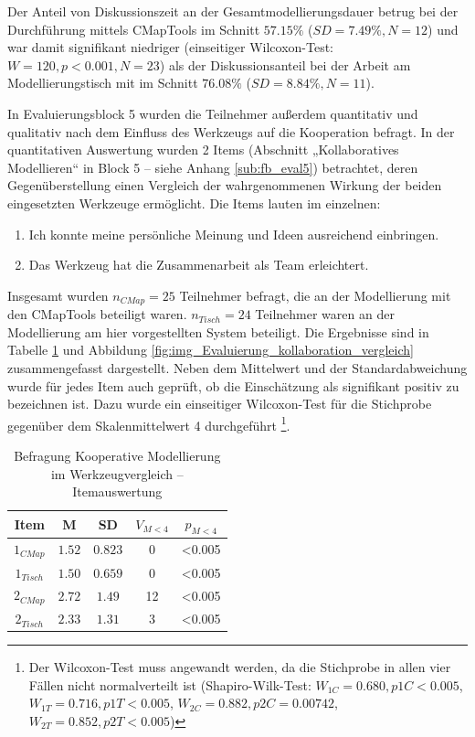 Der Anteil von Diskussionszeit an der Gesamtmodellierungsdauer betrug bei der Durchführung mittels CMapTools im Schnitt $57.15\%$ ($SD=7.49\%, N=12$) und war damit signifikant niedriger (einseitiger Wilcoxon-Test: $W=120, p<0.001, N=23$) als der Diskussionsanteil bei der Arbeit am Modellierungstisch mit im Schnitt $76.08\%$ ($SD=8.84\%, N=11$).

In Evaluierungsblock 5 wurden die Teilnehmer außerdem quantitativ und qualitativ nach dem Einfluss des Werkzeugs auf die Kooperation befragt. In der quantitativen Auswertung wurden 2 Items (Abschnitt „Kollaboratives Modellieren“ in Block 5 -- siehe Anhang \ref{sub:fb_eval5}) betrachtet, deren Gegenüberstellung einen Vergleich der wahrgenommenen Wirkung der beiden eingesetzten Werkzeuge ermöglicht. Die Items lauten im einzelnen:

\begin{enumerate}
	\item Ich konnte meine persönliche Meinung und Ideen ausreichend einbringen.
	\item Das Werkzeug hat die Zusammenarbeit als Team erleichtert.
\end{enumerate}

Insgesamt wurden $n_{CMap}=25$ Teilnehmer befragt, die an der Modellierung mit den CMapTools beteiligt waren. $n_{Tisch}=24$ Teilnehmer waren an der Modellierung am hier vorgestellten System beteiligt. Die Ergebnisse sind in Tabelle \ref{tab:vergleich_kooperative_modellierung} und Abbildung \ref{fig:img_Evaluierung_kollaboration_vergleich} zusammengefasst dargestellt. Neben dem Mittelwert und der Standardabweichung wurde für jedes Item auch geprüft, ob die Einschätzung als signifikant positiv zu bezeichnen ist. Dazu wurde ein einseitiger Wilcoxon-Test für die Stichprobe gegenüber dem Skalenmittelwert 4 durchgeführt \footnote{Der Wilcoxon-Test muss angewandt werden, da die Stichprobe in allen vier Fällen nicht normalverteilt ist (Shapiro-Wilk-Test: $W_{1C}=0.680, p{1C}<0.005$, $W_{1T}=0.716, p{1T}<0.005$, $W_{2C}=0.882, p{2C}=0.00742$, $W_{2T}=0.852, p{2T}<0.005$)}.

\begin{table}[htbp]
	\centering
	\caption{Befragung Kooperative Modellierung im Werkzeugvergleich -- Itemauswertung}

\begin{tabular}{| c || c | c || c | c |}
  \hline
   Item & M & SD & $V_{M<4}$ & $p_{M<4}$ \\ \hline
   $1_{CMap}$ & $1.52$ & $0.823$ & 0 & <0.005 \\ 
   $1_{Tisch}$ & $1.50$ & $0.659$ & 0 & <0.005 \\ \hline
   $2_{CMap}$ & $2.72$ & $1.49$ & 12 & <0.005 \\ 
   $2_{Tisch}$ & $2.33$ & $1.31$ & 3 & <0.005 \\ \hline
\end{tabular}
	\label{tab:vergleich_kooperative_modellierung}
\end{table}

